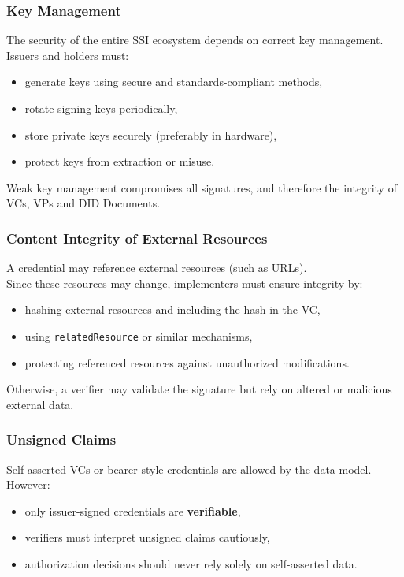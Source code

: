 \vspace{0.4cm}
\subsubsection*{Key Management}

The security of the entire SSI ecosystem depends on correct key management.  
Issuers and holders must:
\begin{itemize}
    \item generate keys using secure and standards-compliant methods,
    \item rotate signing keys periodically,
    \item store private keys securely (preferably in hardware),
    \item protect keys from extraction or misuse.
\end{itemize}

Weak key management compromises all signatures, and therefore the integrity of
VCs, VPs and DID Documents.

\vspace{0.4cm}
\subsubsection*{Content Integrity of External Resources}

A credential may reference external resources (such as URLs).\\
Since these resources may change, implementers must ensure integrity by:
\begin{itemize}
    \item hashing external resources and including the hash in the VC,
    \item using \texttt{relatedResource} or similar mechanisms,
    \item protecting referenced resources against unauthorized modifications.
\end{itemize}

\noindent
Otherwise, a verifier may validate the signature but rely on altered or malicious external data.

\vspace{0.4cm}
\subsubsection*{Unsigned Claims}

Self-asserted VCs or bearer-style credentials are allowed by the data model.
However:
\begin{itemize}
    \item only issuer-signed credentials are \textbf{verifiable},
    \item verifiers must interpret unsigned claims cautiously,
    \item authorization decisions should never rely solely on self-asserted data.
\end{itemize}

